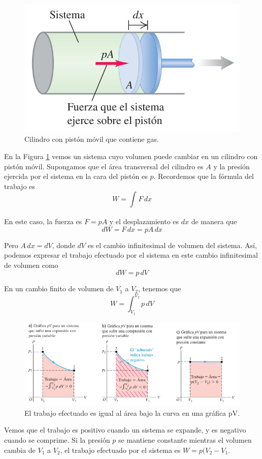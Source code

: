 \documentclass[12pt]{article}
\begin{document}
  \begin{figure}[H]
    \centering
    \includegraphics[width=0.5\linewidth]{imagenes/trabajo-gas-piston.png}
    \caption{Cilindro con pistón móvil que contiene gas.}
    \label{fig:gas-piston}
  \end{figure}
  
  En la Figura \ref{fig:gas-piston} vemos un sistema cuyo volumen puede cambiar en un cilindro con pistón móvil. Supongamos que el área transversal del cilindro es $ A $ y la presión ejercida por el sistema en la cara del pistón es $ p $. Recordemos que la fórmula del trabajo es 
  \[
  W = \int_{}^{} F \,dx
  \]

  En este caso, la fuerza es $ F = pA $ y el desplazamiento es $ dx $ de manera que
  \[
    dW = F\,dx = pA\,dx
  \]

  Pero $ A\,dx = dV $, donde $ dV $ es el cambio infinitesimal de volumen del sistema. Así, podemos expresar el trabajo efectuado por el sistema en este cambio infinitesimal de volumen como 
  \[
  dW = p\,dV
  \]

  En un cambio finito de volumen de $ V_{1} $ a $ V_{2} $, tenemos que
  \[
  W = \int_{V_{1}}^{V_{2}} p \,dV
  \]

  \begin{figure}[H]
    \centering
    \includegraphics[width=0.7\linewidth]{imagenes/trabajo-g-pv.png}
    \caption{El trabajo efectuado es igual al área bajo la curva en una gráfica pV.}
    \label{fig:trabajo-pv}
  \end{figure}
  
  Vemos que el trabajo es positivo cuando un sistema se expande, y es negativo cuando se comprime. Si la presión $ p $ se mantiene constante mientras el volumen cambia de $ V_{1} $ a $ V_{2} $, el trabajo efectuado por el sistema es $ W = p(V_{2}-V_{1} $.
\end{document}

